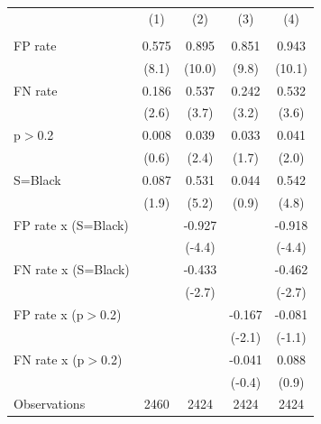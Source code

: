 \begin{tabular}{l*{4}{c}}
\hline\hline
                &\multicolumn{1}{c}{(1)}&\multicolumn{1}{c}{(2)}&\multicolumn{1}{c}{(3)}&\multicolumn{1}{c}{(4)}\\
                &\multicolumn{1}{c}{}&\multicolumn{1}{c}{}&\multicolumn{1}{c}{}&\multicolumn{1}{c}{}\\
\hline
FP rate         &    0.575\sym{***}&    0.895\sym{***}&    0.851\sym{***}&    0.943\sym{***}\\
                &    (8.1)         &   (10.0)         &    (9.8)         &   (10.1)         \\
FN rate         &    0.186\sym{***}&    0.537\sym{***}&    0.242\sym{***}&    0.532\sym{***}\\
                &    (2.6)         &    (3.7)         &    (3.2)         &    (3.6)         \\
p$>$0.2         &    0.008         &    0.039\sym{**} &    0.033\sym{*}  &    0.041\sym{**} \\
                &    (0.6)         &    (2.4)         &    (1.7)         &    (2.0)         \\
S=Black         &    0.087\sym{*}  &    0.531\sym{***}&    0.044         &    0.542\sym{***}\\
                &    (1.9)         &    (5.2)         &    (0.9)         &    (4.8)         \\
FP rate x (S=Black)&                  &   -0.927\sym{***}&                  &   -0.918\sym{***}\\
                &                  &   (-4.4)         &                  &   (-4.4)         \\
FN rate x (S=Black)&                  &   -0.433\sym{***}&                  &   -0.462\sym{***}\\
                &                  &   (-2.7)         &                  &   (-2.7)         \\
FP rate x (p$>$0.2)&                  &                  &   -0.167\sym{**} &   -0.081         \\
                &                  &                  &   (-2.1)         &   (-1.1)         \\
FN rate x (p$>$0.2)&                  &                  &   -0.041         &    0.088         \\
                &                  &                  &   (-0.4)         &    (0.9)         \\
\hline
Observations    &     2460         &     2424         &     2424         &     2424         \\
\hline\hline

\end{tabular}
